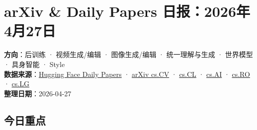 
\section{arXiv \& Daily Papers 日报：2026年4月27日}

\begin{conceptbox}
\textbf{方向}：后训练 · 视频生成/编辑 · 图像生成/编辑 · 统一理解与生成 · 世界模型 · 具身智能 · Style\\
\textbf{数据来源}：\href{https://huggingface.co/papers}{Hugging Face Daily Papers} · \href{https://arxiv.org/list/cs.CV/new}{arXiv cs.CV} · \href{https://arxiv.org/list/cs.CL/new}{cs.CL} · \href{https://arxiv.org/list/cs.AI/new}{cs.AI} · \href{https://arxiv.org/list/cs.RO/new}{cs.RO} · \href{https://arxiv.org/list/cs.LG/new}{cs.LG}\\
\textbf{整理日期}：2026-04-27
\end{conceptbox}

\subsection{今日重点}

